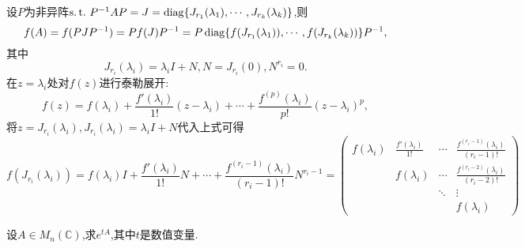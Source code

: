   设$P$为非异阵$\operatorname{s.t.{}} P^{-1}AP=J=\operatorname{diag}\{J_{r_1}(\lambda_1),\cdots,J_{r_k}(\lambda_k)\}$,则
  \[ f(A)=f(PJP^{-1})=Pf(J)P^{-1}=P\operatorname{diag}\{f(J_{r_1}(\lambda_1)),\cdots,f(J_{r_k}(\lambda_k))\}P^{-1}, \]
  其中
  \[ J_{r_i}(\lambda_i)=\lambda_iI+N, N=J_{r_i}(0), N^{r_i}=0. \]
  在$z=\lambda_i$处对$f(z)$进行泰勒展开:
  \[ f(z)=f(\lambda_i)+\frac{f'(\lambda_i)}{1!}(z-\lambda_i)+\cdots+
    \frac{f^{(p)}(\lambda_i)}{p!}(z-\lambda_i)^p, \]
  将$z=J_{r_i}(\lambda_i), J_{r_i}(\lambda_i)=\lambda_iI+N$代入上式可得
  \begin{equation}\label{eq:MF1}
    f(J_{r_i}(\lambda_i))=f(\lambda_i)I+\frac{f'(\lambda_i)}{1!}N+\cdots+
    \frac{f^{(r_i-1)}(\lambda_i)}{(r_i-1)!}N^{r_i-1} =
    \begin{pmatrix}
      f(\lambda_i)&\frac{f'(\lambda_i)}{1!}&\cdots&\frac{f^{(r_i-1)}(\lambda_i)}{(r_i-1)!}\\
                  &f(\lambda_i)&\cdots&\frac{f^{(r_i-2)}(\lambda_i)}{(r_i-2)!}\\
                  &&\ddots&\vdots\\
      &&&f(\lambda_i)
    \end{pmatrix}
  \end{equation}

  \begin{example}
    设$A\in M_n(\mathbb{C})$,求$e^{tA}$,其中$t$是数值变量.
  \end{example}


